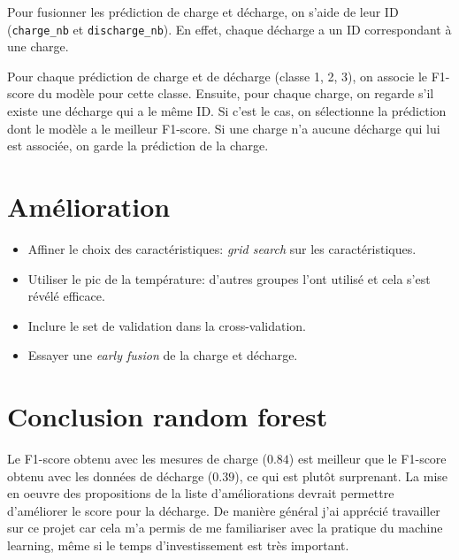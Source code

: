 Pour fusionner les prédiction de charge et décharge, on s'aide de leur ID (\texttt{charge_nb} et \texttt{discharge_nb}). En effet, chaque décharge a un ID correspondant à une charge.

Pour chaque prédiction de charge et de décharge (classe 1, 2, 3), on associe le F1-score du modèle pour cette classe. Ensuite, pour chaque charge, on regarde s'il existe une décharge qui a le même ID. Si c'est le cas, on sélectionne la prédiction dont le modèle a le meilleur F1-score. Si une charge n'a aucune décharge qui lui est associée, on garde la prédiction de la charge.

\section{Amélioration}

\begin{itemize}
    \item Affiner le choix des caractéristiques: \newline \textit{grid search} sur les caractéristiques.
    \item Utiliser le pic de la température: d'autres groupes l'ont utilisé et cela s'est révélé efficace.
    \item Inclure le set de validation dans la cross-validation.
    \item Essayer une \textit{early fusion} de la charge et décharge.
\end{itemize}


\section{Conclusion random forest}

Le F1-score obtenu avec les mesures de charge ($0.84$) est meilleur que le F1-score obtenu avec les données de décharge ($0.39$), ce qui est plutôt surprenant. La mise en oeuvre des propositions de la liste d'améliorations devrait permettre d'améliorer le score pour la décharge. De manière général j'ai apprécié travailler sur ce projet car cela m'a permis de me familiariser avec la pratique du machine learning, même si le temps d'investissement est très important.